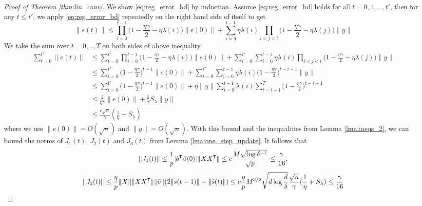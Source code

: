\begin{proof}[Proof of Theorem \ref{thm:lin_conv}]  
We show \eqref{eq:reg_error_bd} by induction. Assume \eqref{eq:reg_error_bd} holds for all $t=0,1,...,t'$, then for any $t\leq t'$, we apply \eqref{eq:reg_error_bd} repeatedly on the right hand side of itself to get
\begin{equation*}
    \|e(t)\|\leq \prod_{i=0}^{t-1}\Big(1-\frac{\eta\gamma}{2}-\eta\lambda(i)\Big)\|e(0)\| + \sum_{i=0}^{t-1}\eta\lambda(i)\prod_{i<j<t}\Big(1-\frac{\eta\gamma}{2}-\eta\lambda(j)\Big)\|y\|
\end{equation*}
We take the sum over $t=0,..,T$ on both sides of above inequality 
\begin{equation*}
\begin{aligned}
    \sum_{t=0}^{t'}\|e(t)\|
    &\leq \sum_{t=0}^{t'}\prod_{i=0}^{t-1}\Big(1-\frac{\eta\gamma}{2}-\eta\lambda(i)\Big)\|e(0)\|  + \sum_{t=0}^{t'}\sum_{i=0}^{t-1}\eta\lambda(i)\prod_{i<j<t}\Big(1-\frac{\eta\gamma}{2}-\eta\lambda(j)\Big)\|y\| \\
    &\leq \sum_{t=0}^{t'}\Big(1-\frac{\eta\gamma}{2}\Big)^{t-1}\|e(0)\|+ \sum_{t=0}^{t'}\sum_{i=0}^{t-1}\eta\lambda(i)\Big(1-\frac{\eta\gamma}{2}\Big)^{t-i-1}\|y\| \\
    &\leq \sum_{t=0}^{t'}\Big(1-\frac{\eta\gamma}{2}\Big)^{t-1}\|e(0)\| + \eta\|y\|\sum_{t=0}^{t-1}\lambda(i)\sum_{t=i+1}^T\Big(1-\frac{\eta\gamma}{2}\Big)^{t-i-1} \\
    &\leq \frac{2}{\eta\gamma}\|e(0)\|+ \frac{2}{\gamma}S_\lambda\|y\| \\
    &\leq \frac{c\sqrt n}{\gamma}(\frac{1}{\eta}+S_\lambda)
\end{aligned}
\end{equation*} 
where we use $\|e(0)\|=O(\sqrt n)$ and $\|y\|=O(\sqrt n)$. With this bound and the inequalities from Lemma \ref{lma:ineqs_2}, we can bound the norms of $J_1(t)$, $J_2(t)$ and $J_3(t)$ from Lemma \ref{lma:one_step_update}. It follows that
\begin{equation}
\label{eq:J1_bd}
\|J_1(t)\| \leq \frac{1}{p}|b\transpose\beta(0)|\|XX\transpose\|\leq c\frac{M\sqrt{\log \delta^{-1}}}{\sqrt p}\leq \frac{\gamma}{16},
\end{equation}
\begin{equation}
\label{eq:J2_bd}
\|J_2(t)\| \leq \frac{\eta}{p}\|X\| \|XX\transpose\|\|\bar{v}\|(2\|s(t-1)\|+\|\tilde{s}(t)\|)\leq c\frac{\eta}{p}M^{3/2}\sqrt{d\log\frac{d}{\delta}}\frac{\sqrt n}{\gamma}(\frac{1}{\eta}+S_\lambda)\leq \frac{\gamma}{16}
\end{equation}

\end{proof}
